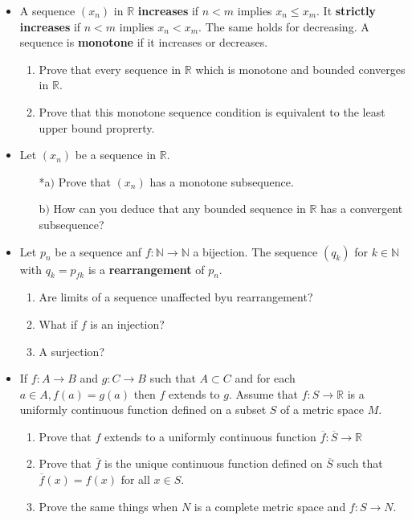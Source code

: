\documentclass[11pt,a4paper]{article}
\newcommand{\pnum}[1]{\item[\textbf{#1}]}
\newcommand{\N}{\mathbb{N}}
\newcommand{\R}{\mathbb{R}}
\begin{document}
\begin{itemize}
	\pnum{2.30} A sequence $(x_n)$ in $\R$ \textbf{increases} if $n < m$ implies $x_n \leq x_m$. It
	\textbf{strictly increases} if $n < m$ implies $x_n < x_m$. The same holds for decreasing. A sequence
	is \textbf{monotone} if it increases or decreases.
	\begin{enumerate}[label=\alph*)]
		\item Prove that every sequence in $\R$ which is monotone and bounded converges in $\R$.
		\item Prove that this monotone sequence condition is equivalent to the least upper bound proprerty.
	\end{enumerate}

	\pnum{2.31} Let $(x_n)$ be a sequence in $\R$.
	\begin{enumerate}
		\item[*a$)$] Prove that $(x_n)$ has a monotone subsequence.
		\item[b$)$] How can you deduce that any bounded sequence in $\R$ has a convergent subsequence? 
	\end{enumerate}

	\pnum{2.32} Let $p_n$ be a sequence anf $f : \N \to \N$ a bijection. The sequence $(q_k)$ for
	$k \in \N$ with $q_k = p_{f k}$ is a \textbf{rearrangement} of $p_n$.
	\begin{enumerate}[label=\alph*)]
		\item Are limits of a sequence unaffected byu rearrangement?
		\item What if $f$ is an injection?
		\item A surjection?
	\end{enumerate}

	\pnum{2.33} If $f : A \to B$ and $g : C \to B$ such that $A \subset C$ and for each $a \in A,
	f(a) = g(a)$ then $f$ extends to $g$. Assume that $f : S \to \R$ is a uniformly continuous function
	defined on a subset $S$ of a metric space $M$.
	\begin{enumerate}[label=\alph*)]
		\item Prove that $f$ extends to a uniformly continuous function $\overline{f} : \overline{S} \to \R$
		\item Prove that $\overline{f}$ is the unique continuous function defined on $\overline{S}$
			such that $\overline{f}(x) = f(x)$ for all $x \in S$.
		\item Prove the same things when $N$ is a complete metric space and $f : S \to N$.
	\end{enumerate}


\end{itemize}
\end{document}
